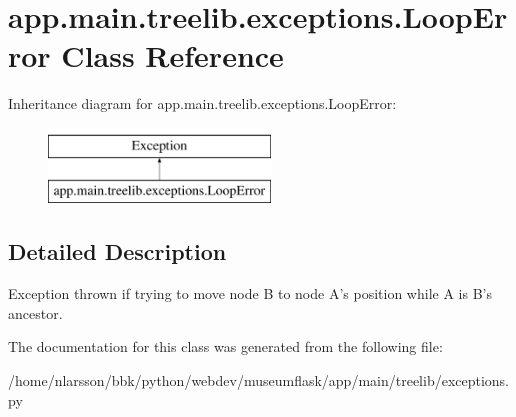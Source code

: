 \hypertarget{classapp_1_1main_1_1treelib_1_1exceptions_1_1LoopError}{}\section{app.\+main.\+treelib.\+exceptions.\+Loop\+Error Class Reference}
\label{classapp_1_1main_1_1treelib_1_1exceptions_1_1LoopError}
Inheritance diagram for app.\+main.\+treelib.\+exceptions.\+Loop\+Error\+:\begin{figure}[H]
\begin{center}
\leavevmode
\includegraphics[height=2.000000cm]{classapp_1_1main_1_1treelib_1_1exceptions_1_1LoopError}
\end{center}
\end{figure}


\subsection{Detailed Description}
\begin{DoxyVerb}Exception thrown if trying to move node B to node A's position
while A is B's ancestor.
\end{DoxyVerb}
 

The documentation for this class was generated from the following file\+:\begin{DoxyCompactItemize}
\item 
/home/nlarsson/bbk/python/webdev/museumflask/app/main/treelib/exceptions.\+py\end{DoxyCompactItemize}

